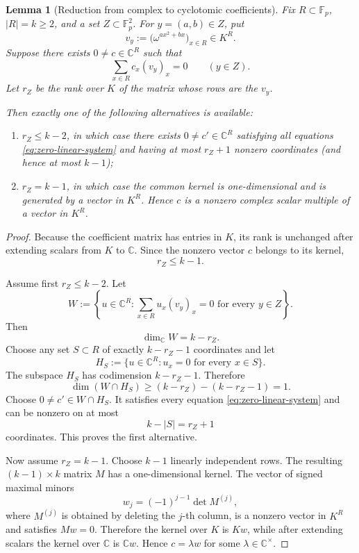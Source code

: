 \documentclass[11pt]{article}
\newtheorem{lemma}[theorem]{Lemma}
\newcommand{\F}{\mathbb F}
\newcommand{\C}{\mathbb C}
\begin{document}
\begin{lemma}[Reduction from complex to cyclotomic coefficients]
\label{lem:complex-to-cyclotomic}
Fix \(R\subset\F_p\), \(|R|=k\ge2\), and a set
\(Z\subset\F_p^2\).  For \(y=(a,b)\in Z\), put
\[
 v_y:=
 \bigl(\omega^{a x^2+b x}\bigr)_{x\in R}
 \in K^R.
\]
Suppose there exists \(0\ne c\in\C^R\) such that
\[
 \sum_{x\in R}c_x(v_y)_x=0
 \qquad(y\in Z).
 \label{eq:zero-linear-system}
\]
Let \(r_Z\) be the rank over \(K\) of the matrix whose rows are the
\(v_y\).

Then exactly one of the following alternatives is available:

\begin{enumerate}
\item \(r_Z\le k-2\), in which case there exists
\(0\ne c'\in\C^R\) satisfying all equations
\eqref{eq:zero-linear-system} and having at most \(r_Z+1\) nonzero
coordinates (and hence at most \(k-1\));
\item \(r_Z=k-1\), in which case the common kernel is one-dimensional
and is generated by a vector in \(K^R\).  Hence \(c\) is a nonzero
complex scalar multiple of a vector in \(K^R\).
\end{enumerate}
\end{lemma}

\begin{proof}
Because the coefficient matrix has entries in \(K\), its rank is
unchanged after extending scalars from \(K\) to \(\C\).  Since the
nonzero vector \(c\) belongs to its kernel,
\[
 r_Z\le k-1.
\]

Assume first \(r_Z\le k-2\).  Let
\[
 W:=
 \left\{
 u\in\C^R:
 \sum_{x\in R}u_x(v_y)_x=0
 \text{ for every }y\in Z
 \right\}.
\]
Then
\[
 \dim_\C W=k-r_Z.
\]
Choose any set \(S\subset R\) of exactly \(k-r_Z-1\) coordinates and let
\[
 H_S:=\{u\in\C^R:u_x=0\text{ for every }x\in S\}.
\]
The subspace \(H_S\) has codimension \(k-r_Z-1\).  Therefore
\[
 \dim(W\cap H_S)
 \ge (k-r_Z)-(k-r_Z-1)=1.
\]
Choose \(0\ne c'\in W\cap H_S\).  It satisfies every equation
\eqref{eq:zero-linear-system} and can be nonzero on at most
\[
 k-|S|=r_Z+1
\]
coordinates.  This proves the first alternative.

Now assume \(r_Z=k-1\).  Choose \(k-1\) linearly independent rows.  The
resulting \((k-1)\times k\) matrix \(M\) has a one-dimensional kernel.
The vector of signed maximal minors
\[
 w_j=(-1)^{j-1}\det M^{(j)},
\]
where \(M^{(j)}\) is obtained by deleting the \(j\)-th column, is a
nonzero vector in \(K^R\) and satisfies \(Mw=0\).  Therefore the kernel
over \(K\) is \(Kw\), while after extending scalars the kernel over
\(\C\) is \(\C w\).  Hence \(c=\lambda w\) for some
\(\lambda\in\C^\times\).
\end{proof}
\end{document}
